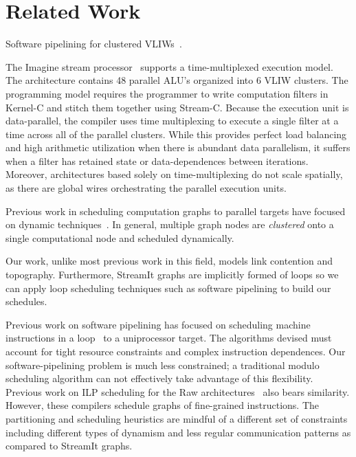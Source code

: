 \section{Related Work}
\label{sec:related}

Software pipelining for clustered VLIWs~\cite{qian02}.

The Imagine stream processor~\cite{rixner98bandwidthefficient}
supports a time-multiplexed execution model.  The architecture
contains 48 parallel ALU's organized into 6 VLIW clusters.  The
programming model requires the programmer to write computation filters
in Kernel-C and stitch them together using Stream-C.  Because the
execution unit is data-parallel, the compiler uses time multiplexing
to execute a single filter at a time across all of the parallel
clusters.  While this provides perfect load balancing and high
arithmetic utilization when there is abundant data parallelism, it
suffers when a filter has retained state or data-dependences between
iterations.  Moreover, architectures based solely on
time-multiplexing do not scale spatially, as there are global wires
orchestrating the parallel execution units. 

Previous work in scheduling computation graphs to parallel targets
have focused on dynamic techniques~\cite{SDFSched, SDFSched2,
may87communicating, DAGSched}. In general, multiple graph nodes are
{\it clustered} onto a single computational node and scheduled
dynamically.

Our work, unlike most previous work in this field, models link
contention and topography.  Furthermore, StreamIt graphs are
implicitly formed of loops so we can apply loop scheduling techniques
such as software pipelining to build our schedules.


Previous work on software pipelining has focused on scheduling machine
instructions in a loop~\cite{lam-softpipe, rau-softpipe} to a
uniprocessor target.  The algorithms devised must account for tight
resource constraints and complex instruction dependences.  Our
software-pipelining problem is much less constrained; a traditional
modulo scheduling algorithm can not effectively take advantage of this
flexibility.  Previous work on ILP scheduling for the Raw
architectures~\cite{lee98spacetime} also bears similarity.  However,
these compilers schedule graphs of fine-grained instructions. The
partitioning and scheduling heuristics are mindful of a different set
of constraints including different types of dynamism and less regular
communication patterns as compared to StreamIt graphs.


